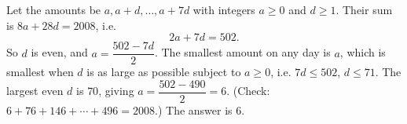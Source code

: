 Let the amounts be $a,a+d,\dots,a+7d$ with integers $a\ge0$ and $d\ge1$. Their sum is $8a+28d=2008$, i.e.
\[2a+7d=502.\]
So $d$ is even, and $a=\dfrac{502-7d}{2}$. The smallest amount on any day is $a$, which is smallest when $d$ is as large as possible subject to $a\ge0$, i.e. $7d\le502$, $d\le71$. The largest even $d$ is $70$, giving $a=\dfrac{502-490}{2}=6$. (Check: $6+76+146+\cdots+496=2008$.) The answer is $\boxed{6}$.
